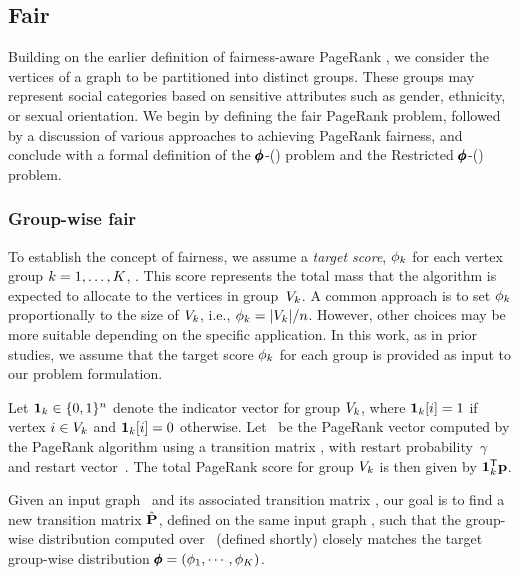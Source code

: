 \documentclass[sigconf, anonymous, review]{acmart}
\begin{document}
\subsection{Fair \pagerank}

Building on the earlier definition of fairness-aware PageRank \citep{tsioutsiouliklis_fairness-aware_2021, tsioutsiouliklis_link_2022}, we consider the vertices of a graph to be partitioned into distinct groups. These groups may represent social categories based on sensitive attributes such as gender, ethnicity, or sexual orientation. We begin by defining the fair PageRank problem, followed by a discussion of various approaches to achieving PageRank fairness, and conclude with a formal definition of the $\pmb{\phi}$-\pagerank (\phiPageRank) problem and the Restricted $\pmb{\phi}$-\pagerank (\resfpr) problem.

\subsubsection{Group-wise fair \pagerank}
%
To establish the concept of \pagerank fairness, we assume a \emph{target \pagerank score}, $\phi_k$ for each vertex group $k = 1, \ldots, K$, . This score represents the total \pagerank mass that the algorithm is expected to allocate to the vertices in group~$V_k$. A common approach is to set $\phi_k$ proportionally to the size of $V_k$, i.e., $\phi_k = |V_k| / n$. However, other choices may be more suitable depending on the specific application. In this work, as in prior studies, we assume that the target \pagerank score $\phi_k$ for each group is provided as input to our problem formulation.

Let $\mathbf{{1}}_{k} \in \{0, 1\}^{n}$ denote the indicator vector for group $V_k$, where $\mathbf{{1}}_{k}[i] = 1$ if vertex $i \in V_k$ and $\mathbf{{1}}_{k}[i] = 0$ otherwise. Let \prvector\ be the PageRank vector computed by the PageRank algorithm using a transition matrix \transmatrix, with restart probability~$\gamma$ and restart vector~\vectv. The total PageRank score for group $V_k$ is then given by $\mathbf{{1}}_{k}^{\mathsf{T}} \mathbf{{p}}$. 



Given an input graph \graph\ and its associated transition matrix \transmatrix, our goal is to find a new transition matrix $\hat{\mathbf{{P}}}$, defined on the same input graph \graph, such that the group-wise \pagerank distribution computed over \newtransmatrix\ (defined shortly) closely matches the target group-wise \pagerank distribution $\pmb{\phi} = (\phi_1, \cdots, \phi_K)$.
\end{document}

